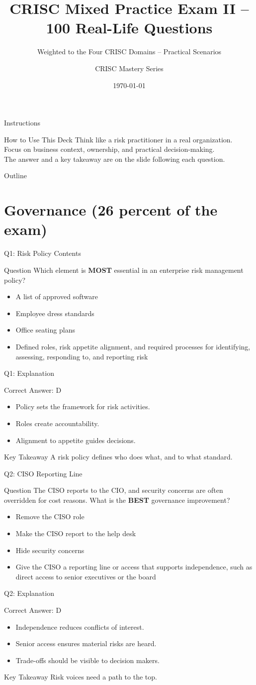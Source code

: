 \documentclass[aspectratio=169]{beamer}
\title{CRISC Mixed Practice Exam II -- 100 Real-Life Questions}
\subtitle{Weighted to the Four CRISC Domains -- Practical Scenarios}
\author{CRISC Mastery Series}
\date{\today}
\newcommand{\hq}[7]{%
	\begin{frame}{Q#1: #2}
		\begin{block}{Question}
			#3
		\end{block}
		\begin{itemize}
			#4
		\end{itemize}
	\end{frame}
	\begin{frame}{Q#1: Explanation}
		\begin{block}{Correct Answer: #5}
			\begin{itemize}
				#6
			\end{itemize}
		\end{block}
		\begin{alertblock}{Key Takeaway}
			#7
		\end{alertblock}
	\end{frame}
}
\begin{document}
	\begin{frame}
		\titlepage
	\end{frame}

	\begin{frame}{Instructions}
		\begin{alertblock}{How to Use This Deck}
			Think like a risk practitioner in a real organization.\\
			Focus on business context, ownership, and practical decision-making.\\
			The answer and a key takeaway are on the slide following each question.
		\end{alertblock}
	\end{frame}

	\begin{frame}{Outline}
		\tableofcontents
	\end{frame}

	\section{Governance (26 percent of the exam)}

	\hq{1}{Risk Policy Contents}
	{Which element is \textbf{MOST} essential in an enterprise risk management policy?}
	{\item[\textbf{(A)}] A list of approved software
		\item[\textbf{(B)}] Employee dress standards
		\item[\textbf{(C)}] Office seating plans
		\item[\textbf{(D)}] Defined roles, risk appetite alignment, and required processes for identifying, assessing, responding to, and reporting risk}
	{D}
	{\item Policy sets the framework for risk activities.
		\item Roles create accountability.
		\item Alignment to appetite guides decisions.}
	{A risk policy defines who does what, and to what standard.}

	\hq{2}{CISO Reporting Line}
	{The CISO reports to the CIO, and security concerns are often overridden for cost reasons. What is the \textbf{BEST} governance improvement?}
	{\item[\textbf{(A)}] Remove the CISO role
		\item[\textbf{(B)}] Make the CISO report to the help desk
		\item[\textbf{(C)}] Hide security concerns
		\item[\textbf{(D)}] Give the CISO a reporting line or access that supports independence, such as direct access to senior executives or the board}
	{D}
	{\item Independence reduces conflicts of interest.
		\item Senior access ensures material risks are heard.
		\item Trade-offs should be visible to decision makers.}
	{Risk voices need a path to the top.}
\end{document}
